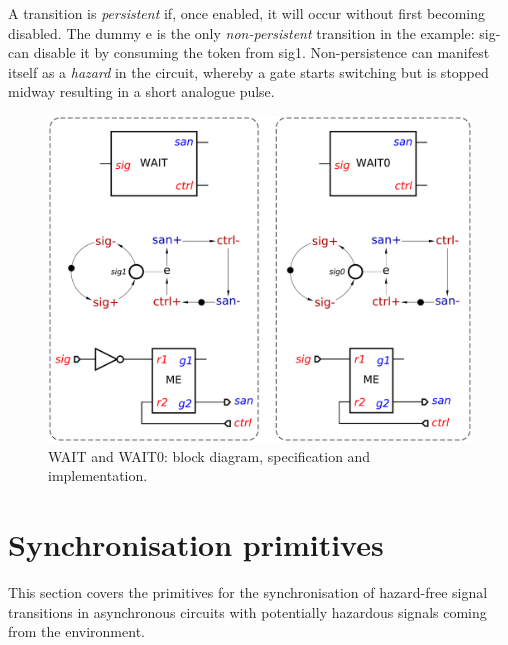 \documentclass[conference]{IEEEtran}
\begin{document}
A transition is \emph{persistent} if, once enabled, it will occur without first becoming
disabled. The dummy \textsf{e} is the only \emph{non-persistent} transition in the
example: \textsf{sig-} can disable it by consuming the token from \textsf{sig1}. Non-persistence
can manifest itself as a \emph{hazard} in the circuit, whereby a gate starts
switching but is stopped midway resulting in a short analogue pulse.


\begin{figure}
\begin{center}
    \includegraphics[scale=0.23]{fig/WAIT.pdf}
    \vspace{-6mm}
    \caption{\textsf{WAIT} and \textsf{WAIT0}: block diagram,
    specification and implementation.}
    \label{fig:wait}
    \vspace{-6mm}
\end{center}
\end{figure}

\section{Synchronisation primitives}\label{sec-sync}

This section covers the primitives for the synchronisation of hazard-free signal
transitions in asynchronous circuits with potentially hazardous signals coming
from the environment.
\end{document}
